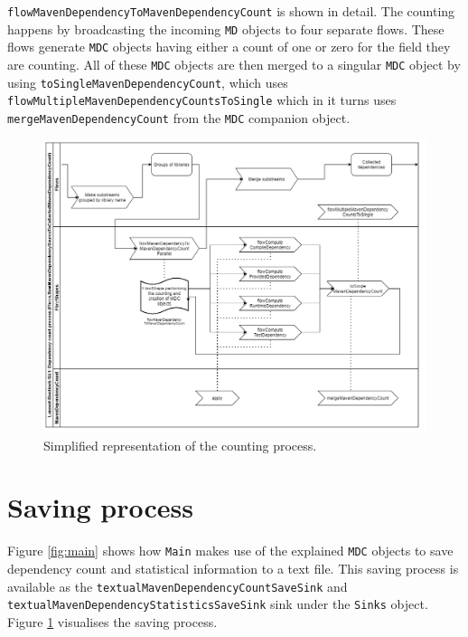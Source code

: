 \texttt{flowMavenDependencyToMavenDependencyCount} is shown in detail.
The counting happens by broadcasting the incoming \texttt{MD} objects to four separate flows.
These flows generate \texttt{MDC} objects having either a count of one or zero for the field they are counting.
All of these \texttt{MDC} objects are then merged to a singular \texttt{MDC} object by using \texttt{toSingleMavenDependencyCount}, which uses \texttt{flowMultipleMavenDependencyCountsToSingle} which in it turns uses \texttt{merge\-Maven\-Dependency\-Count} from the \texttt{MDC} companion object. 

\begin{figure}[H]
    \centering
    \includegraphics[width=0.95\linewidth]{images/counting.png}
    \captionsetup{width=0.7\linewidth}
    \captionsetup{justification=centering}
    \caption{Simplified representation of the counting process.  }
    \label{fig:counting}
\end{figure}





\section{Saving process}
\label{sec:sink_proc}

Figure \ref{fig:main} shows how \texttt{Main} makes use of the explained \texttt{MDC} objects to save dependency count and statistical information to a text file.
This saving process is available as the \texttt{textual\-Maven\-Dependency\-Count\-Save\-Sink} and \texttt{textualMavenDependencyStatisticsSaveSink} sink under the \texttt{Sinks} object.
Figure \ref{fig:counting} visualises the saving process.

